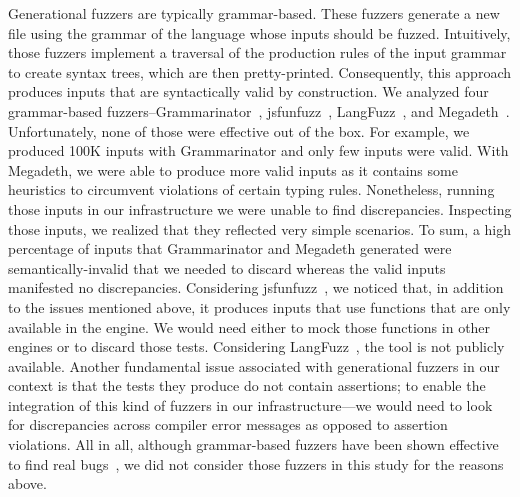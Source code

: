 \documentclass[sigconf,review, anonymous]{acmart}
\begin{document}
Generational fuzzers are typically grammar-based. These fuzzers
generate a new file using the grammar of the language whose inputs
should be fuzzed. Intuitively, those fuzzers implement a traversal of
the production rules of the input grammar to create syntax trees,
which are then pretty-printed. Consequently, this approach produces
inputs that are syntactically valid by construction. We analyzed four
grammar-based fuzzers--Grammarinator~\cite{grammarinator},
jsfunfuzz~\cite{jsfunfuzz},
LangFuzz~\cite{Holler:2012:FCF:2362793.2362831}, and
Megadeth~\cite{grieco2016quickfuzz}.  Unfortunately, none of those
were effective out of the box. For example, we produced 100K inputs
with Grammarinator and only few inputs were valid. With Megadeth, we
were able to produce more valid inputs as it
contains some heuristics to circumvent violations of certain typing
rules.
Nonetheless, running those inputs in our infrastructure we were unable
to find discrepancies. Inspecting those inputs, we realized that they
reflected very simple scenarios. To sum, a high percentage of inputs
that Grammarinator and Megadeth generated were semantically-invalid
that we needed to discard whereas the valid inputs manifested no
discrepancies. Considering jsfunfuzz~\cite{jsfunfuzz}, we noticed
that, in addition to the issues mentioned above, it produces inputs
that use functions that are only available in the \smonkey{}
engine. We would need either to mock those functions in other engines
or to discard those tests. Considering
LangFuzz~\cite{Holler:2012:FCF:2362793.2362831}, the tool is not
publicly available. Another fundamental issue associated with
generational fuzzers in our context is that the tests they produce do
not contain assertions; to enable the integration of this kind of
fuzzers in our infrastructure---we would need to look for
discrepancies across compiler error messages as opposed to assertion
violations.  All in all, although grammar-based fuzzers have been
shown effective to find real
bugs~\cite{Holler:2012:FCF:2362793.2362831}, we did not consider those
fuzzers in this study for the reasons above.

\end{document}
